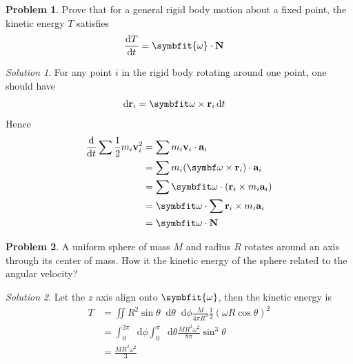 \documentclass[twoside,11pt]{article}
\newcommand{\lms}{\fontfamily{lmss}\selectfont} %
\renewcommand*\d{\mathop{}\!\mathrm{d}}
\theoremstyle{definition}
\newtheorem{problem}{\lms Problem}
\theoremstyle{remark}
\newtheorem*{solution}{Solution}
\begin{document}
\begin{problem} 
Prove that for a general rigid body motion about a fixed point, the kinetic
energy $T$ satisfies
\begin{align}
    \frac{\d T}{\d t} &= \symbfit{\omega}\cdot \mathbf{N}
\end{align}
\end{problem}
\begin{solution} 
For any point $i$ in the rigid body rotating around one point,
one should have
\begin{align*}
    \d\mathbf r_i &= \symbfit\omega\times\mathbf r_i\d t
\end{align*}
Hence
\begin{align*}
    \frac{\d}{\d t}\sum\frac{1}{2}m_i\mathbf{v}_i^2
    &= \sum m_i\mathbf v_i\cdot\mathbf a_i\\
    &= \sum m_i(\symbf\omega\times\mathbf r_i)\cdot \mathbf a_i\\
    &= \sum\symbfit\omega\cdot(\mathbf r_i\times m_i\mathbf a_i)\\
    &= \symbfit\omega\cdot\sum\mathbf r_i\times m_i\mathbf a_i\\
    &= \symbfit\omega\cdot\mathbf N
\end{align*}
\end{solution}


\begin{problem}
A uniform sphere of mass $M$ and radius $R$ rotates around an axis through its
center of mass.
How it the kinetic energy of the sphere related to the angular velocity?
\end{problem}
\begin{solution}
Let the $z$ axis align onto $\symbfit{\omega}$, then
the kinetic energy is
\begin{align*}
    T &= \iint R^2\sin\theta \d\theta\d\phi\frac{M}{4\pi R^2}
    \frac{1}{2}(\omega R\cos\theta)^2\\
      &= \int_0^{2\pi}\d \phi\int_0^\pi\d\theta
      \frac{MR^2\omega^2}{8\pi}\sin^3\theta\\
      &= \frac{MR^2\omega^2}{3}
\end{align*}
\end{solution}



\end{document}
